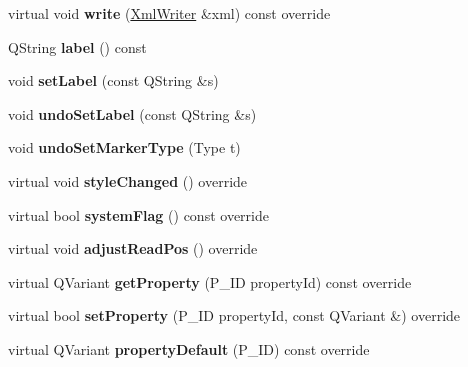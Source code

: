 \begin{DoxyCompactItemize}
virtual void {\bfseries write} (\hyperlink{class_ms_1_1_xml_writer}{Xml\+Writer} \&xml) const override
\item 
\mbox{\label{class_ms_1_1_marker_a5484c4dfa512a645a9c97dd285600e6b}} 
Q\+String {\bfseries label} () const
\item 
\mbox{\label{class_ms_1_1_marker_a8f10086f2f4d34bc12eab4efa6b10013}} 
void {\bfseries set\+Label} (const Q\+String \&s)
\item 
\mbox{\label{class_ms_1_1_marker_a40b19f617c79a720caf5cede6d685b1f}} 
void {\bfseries undo\+Set\+Label} (const Q\+String \&s)
\item 
\mbox{\label{class_ms_1_1_marker_a379a1df82239224964c6be3ca7d7b99f}} 
void {\bfseries undo\+Set\+Marker\+Type} (Type t)
\item 
\mbox{\label{class_ms_1_1_marker_abf47fb55b887d6d8ac0293a1e1d5b74a}} 
virtual void {\bfseries style\+Changed} () override
\item 
\mbox{\label{class_ms_1_1_marker_a13c77b376aeb3109192f8c562a39f510}} 
virtual bool {\bfseries system\+Flag} () const override
\item 
\mbox{\label{class_ms_1_1_marker_ae773de09d176e15318d5a1580256a331}} 
virtual void {\bfseries adjust\+Read\+Pos} () override
\item 
\mbox{\label{class_ms_1_1_marker_affa6e12b479cbb6a16458f31096ea273}} 
virtual Q\+Variant {\bfseries get\+Property} (P\+\_\+\+ID property\+Id) const override
\item 
\mbox{\label{class_ms_1_1_marker_a29e726c80ad098d14e25d69f222c6c9f}} 
virtual bool {\bfseries set\+Property} (P\+\_\+\+ID property\+Id, const Q\+Variant \&) override
\item 
\mbox{\label{class_ms_1_1_marker_ab755c1b33ac15a536f3c3939353a043b}} 
virtual Q\+Variant {\bfseries property\+Default} (P\+\_\+\+ID) const override
\item 

\end{DoxyCompactItemize}

